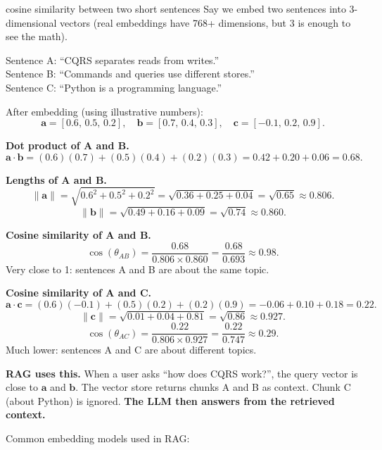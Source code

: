 \documentclass[a4paper,11pt]{article}
\begin{document}
\begin{worked}{cosine similarity between two short sentences}
Say we embed two sentences into 3-dimensional vectors (real embeddings have 768+ dimensions,
but 3 is enough to see the math).

Sentence A: ``CQRS separates reads from writes.''\\
Sentence B: ``Commands and queries use different stores.''\\
Sentence C: ``Python is a programming language.''

After embedding (using illustrative numbers):
\[
  \mathbf{a} = [0.6,\, 0.5,\, 0.2], \quad
  \mathbf{b} = [0.7,\, 0.4,\, 0.3], \quad
  \mathbf{c} = [-0.1,\, 0.2,\, 0.9].
\]

\begin{steps}
  \item \textbf{Dot product of A and B.}
    \[
      \mathbf{a} \cdot \mathbf{b}
      = (0.6)(0.7) + (0.5)(0.4) + (0.2)(0.3)
      = 0.42 + 0.20 + 0.06 = 0.68.
    \]
  \item \textbf{Lengths of A and B.}
    \[
      \|\mathbf{a}\| = \sqrt{0.6^2 + 0.5^2 + 0.2^2}
      = \sqrt{0.36 + 0.25 + 0.04} = \sqrt{0.65} \approx 0.806.
    \]
    \[
      \|\mathbf{b}\| = \sqrt{0.49 + 0.16 + 0.09} = \sqrt{0.74} \approx 0.860.
    \]
  \item \textbf{Cosine similarity of A and B.}
    \[
      \cos(\theta_{AB}) = \frac{0.68}{0.806 \times 0.860}
      = \frac{0.68}{0.693} \approx \mathbf{0.98}.
    \]
    Very close to 1: sentences A and B are about the same topic.
  \item \textbf{Cosine similarity of A and C.}
    \[
      \mathbf{a} \cdot \mathbf{c}
      = (0.6)(-0.1) + (0.5)(0.2) + (0.2)(0.9)
      = -0.06 + 0.10 + 0.18 = 0.22.
    \]
    \[
      \|\mathbf{c}\| = \sqrt{0.01 + 0.04 + 0.81} = \sqrt{0.86} \approx 0.927.
    \]
    \[
      \cos(\theta_{AC}) = \frac{0.22}{0.806 \times 0.927}
      = \frac{0.22}{0.747} \approx \mathbf{0.29}.
    \]
    Much lower: sentences A and C are about different topics.
  \item \textbf{RAG uses this.}
    When a user asks ``how does CQRS work?'', the query vector is close to $\mathbf{a}$
    and $\mathbf{b}$.
    The vector store returns chunks A and B as context.
    Chunk C (about Python) is ignored.
    \textbf{The LLM then answers from the retrieved context.}
\end{steps}
\end{worked}

Common embedding models used in RAG:
\end{document}

